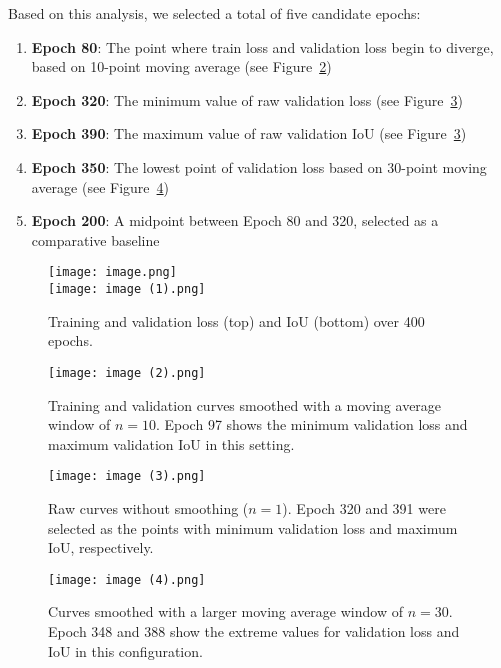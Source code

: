 \documentclass{article}
\begin{document}
Based on this analysis, we selected a total of five candidate epochs:

\begin{enumerate}
    \item \textbf{Epoch 80}: The point where train loss and validation loss begin to diverge, based on 10-point moving average (see Figure~\ref{fig:ma10_curves})
    \item \textbf{Epoch 320}: The minimum value of raw validation loss (see Figure~\ref{fig:raw_extremes})
    \item \textbf{Epoch 390}: The maximum value of raw validation IoU (see Figure~\ref{fig:raw_extremes})
    \item \textbf{Epoch 350}: The lowest point of validation loss based on 30-point moving average (see Figure~\ref{fig:ma30_curves})
    \item \textbf{Epoch 200}: A midpoint between Epoch 80 and 320, selected as a comparative baseline
\end{enumerate}

\begin{figure}[t]
  \centering
  \texttt{[image: image.png]} \\[1ex] %
  \texttt{[image: image (1).png]}         %
  \caption{Training and validation loss (top) and IoU (bottom) over 400 epochs.}
  \label{fig:training_curves}
\end{figure}

\begin{figure}[t]
  \centering
  \texttt{[image: image (2).png]}
  \caption{Training and validation curves smoothed with a moving average window of $n=10$. Epoch 97 shows the minimum validation loss and maximum validation IoU in this setting.}
  \label{fig:ma10_curves}
\end{figure}

\begin{figure}[t]
  \centering
  \texttt{[image: image (3).png]}
  \caption{Raw curves without smoothing ($n=1$). Epoch 320 and 391 were selected as the points with minimum validation loss and maximum IoU, respectively.}
  \label{fig:raw_extremes}
\end{figure}

\begin{figure}[t]
  \centering
  \texttt{[image: image (4).png]}
  \caption{Curves smoothed with a larger moving average window of $n=30$. Epoch 348 and 388 show the extreme values for validation loss and IoU in this configuration.}
  \label{fig:ma30_curves}
\end{figure}
\end{document}

